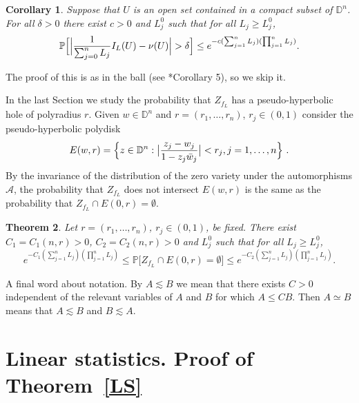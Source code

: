 \documentclass[12pt,twoside,final,amsfonts]{amsart}
\theoremstyle{plain}
\newtheorem{theorem}{Theorem}
\newtheorem{corollary}[theorem]{Corollary}
\theoremstyle{definition}
\theoremstyle{definition}
\begin{document}
\begin{corollary}\label{conseqSLD}
Suppose that $U$ is an open set contained in a compact subset of ${\mathbb{D}}^n$. For all $\delta>0$ there exist $c>0$ and $L_j^0$ such that for all $L_j\geq L_j^0$,
\[
\mathbb P\Bigl[\Bigl|\frac{1}{\sum_{j=0}^n L_j}I_L(U)-\nu(U)\Bigr|>\delta\Bigr]\leq e^{-c{(\sum_{j=1}^n L_j)(\prod_{j=1}^n L_j)}}.
\]
\end{corollary}

The proof of this is as in the ball (see \cite{BMP}*{Corollary 5}), so we skip it.

 

In the last Section we study the probability that $Z_{f_L}$ has a pseudo-hyperbolic hole of polyradius $r$. Given $w\in {\mathbb{D}}^n$ and $r=(r_1,\dots,r_n)$, $r_j \in (0,1)$ consider the pseudo-hyperbolic polydisk
\[
 E(w,r)=\Bigl\{z\in{\mathbb{D}}^n : \bigl|\frac{z_j-w_j}{1-z_j\bar w_j}\bigr|<r_j, j=1,\dots,n\Bigr\}\ .
\]
By the invariance of the distribution of the zero variety under the automorphisms $\mathcal A$, the probability that $Z_{f_L}$ does not intersect $E(w,r)$ is the same as the probability that $Z_{f_L}\cap E(0,r)=\emptyset$.

\begin{theorem}\label{holethm}
Let $r=(r_1,\dots,r_n)$, $r_j\in (0,1)$, be fixed. There exist $C_1=C_1(n,r)>0$, $C_2=C_2(n,r)>0$ and $L_j^0$ such that for all
$L_j\geq L_j^0$,
\[
e^{-C_{1}{(\sum_{j=1}^n L_j)(\prod_{j=1}^n L_j)}} \leq \mathbb P\bigl[Z_{f_L}\cap E(0,r)=\emptyset\bigr]\leq e^{-C_{2}{(\sum_{j=1}^n L_j)(\prod_{j=1}^n L_j)}}.
\]
\end{theorem}

A final word about notation. By $A\lesssim B$ we mean that there exists $C>0$ independent of the relevant variables of $A$ and $B$ for which $A\leq CB$. Then $A\simeq B$ means that $A\lesssim B$ and $B\lesssim A$.

\section{Linear statistics. Proof of Theorem~\ref{LS}}
\end{document}

